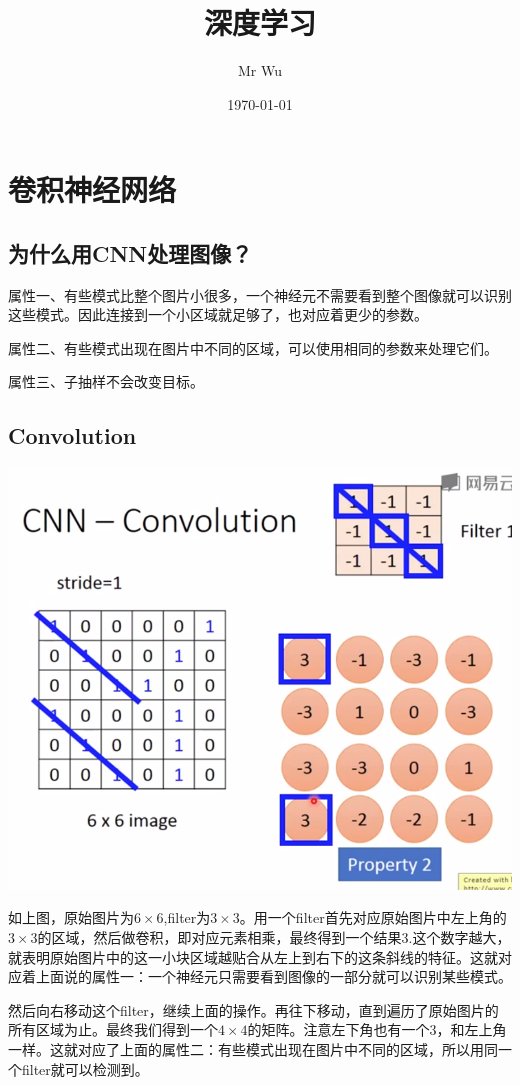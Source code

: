 \documentclass{ctexart}
\title{深度学习}
\author{Mr Wu}
\date{\today}
\begin{document}
	\maketitle
	\section{卷积神经网络}
	\subsection{为什么用CNN处理图像？}
	属性一、有些模式比整个图片小很多，一个神经元不需要看到整个图像就可以识别这些模式。因此连接到一个小区域就足够了，也对应着更少的参数。
	
	属性二、有些模式出现在图片中不同的区域，可以使用相同的参数来处理它们。
	
	属性三、子抽样不会改变目标。
	\subsection{Convolution}
	\includegraphics[scale=0.5]{1}
	
	如上图，原始图片为$ 6 \times 6 $,filter为$ 3 \times 3 $。用一个filter首先对应原始图片中左上角的$ 3 \times 3 $的区域，然后做卷积，即对应元素相乘，最终得到一个结果3.这个数字越大，就表明原始图片中的这一小块区域越贴合从左上到右下的这条斜线的特征。这就对应着上面说的属性一：一个神经元只需要看到图像的一部分就可以识别某些模式。
	
	然后向右移动这个filter，继续上面的操作。再往下移动，直到遍历了原始图片的所有区域为止。最终我们得到一个$ 4 \times 4 $的矩阵。注意左下角也有一个3，和左上角一样。这就对应了上面的属性二：有些模式出现在图片中不同的区域，所以用同一个filter就可以检测到。
\end{document}
